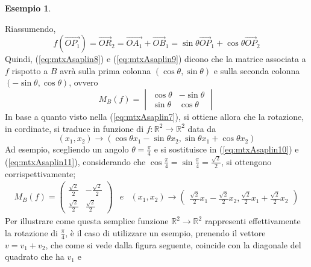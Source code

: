 \documentclass{book}
\theoremstyle{definition}
\newtheorem{es}{Esempio}[section]
\theoremstyle{plain}
\begin{document}
\begin{es}
\begin{enumerate}
    Riassumendo,
    \begin{equation}
      \label{eq:mtxAsaplin9}
      f(\vec{OP_1})=\vec{OR}_2=\vec{OA_1}+\vec{OB}_1=\sin\theta
      \vec{OP}_1+\cos\theta\vec{OP}_2
    \end{equation}
    Quindi, (\ref{eq:mtxAsaplin8}) e (\ref{eq:mtxAsaplin9}) dicono
    che la matrice associata a $f$ rispotto a $B$ avrà sulla prima
    colonna $(\cos\theta, \sin\theta)$ e sulla seconda colonna
    $(-\sin \theta, \cos\theta)$, ovvero
    \begin{equation}
      \label{eq:mtxAsaplin10}
      M_B(f)=
      \begin{vmatrix}
        \cos\theta & -\sin\theta\\
        \sin\theta & \cos \theta
      \end{vmatrix}
    \end{equation}
    In base a quanto visto nella (\ref{eq:mtxAsaplin7}), si ottiene
    allora che la rotazione, in cordinate, si traduce in funzione di
    $f:\mathds{R}^2\to\mathds{R}^2$ data da
    \begin{equation}
      \label{eq:mtxAsaplin11}
      (x_1,x_2)\to (\cos\theta{}x_1-\sin\theta{}x_2,\sin\theta{}x_1
      +\cos\theta{}x_2)
    \end{equation}
    Ad esempio, scegliendo un angolo $\theta=\frac{\pi}{4}$ e si
    sostituisce in (\ref{eq:mtxAsaplin10}) e (\ref{eq:mtxAsaplin11}),
    considerando che $\cos\frac{\pi}{4}=\sin\frac{\pi}{4}=\frac{\sqrt{2}}{2}$,
    si ottengono corrispettivamente;
    \begin{eqnarray}
      \label{eq:mtxAsaplin12}
      M_B(f)=
      \begin{pmatrix}
        \frac{\sqrt{2}}{2} & -\frac{\sqrt{2}}{2}\\
        \frac{\sqrt{2}}{2} & \frac{\sqrt{2}}{2}
      \end{pmatrix} & e & (x_1,x_2)\to
                          \begin{pmatrix}
                            \frac{\sqrt{2}}{2}x_1-\frac{\sqrt{2}}{2}x_2,
                            \frac{\sqrt{2}}{2}x_1+\frac{\sqrt{2}}{2}x_2
                          \end{pmatrix}
    \end{eqnarray}
    Per illustrare come questa semplice funzione $\mathds{R}^2\to \mathds{R}^2$
    rappresenti effettivamente la rotazione di $\frac{\pi}{4}$, è il caso di
    utilizzare un esempio, prenendo il vettore $v=v_1+v_2$, che come si vede
    dalla figura seguente, coincide con la diagonale del quadrato che ha $v_1$ e

\end{enumerate}
\end{es}
\end{document}
